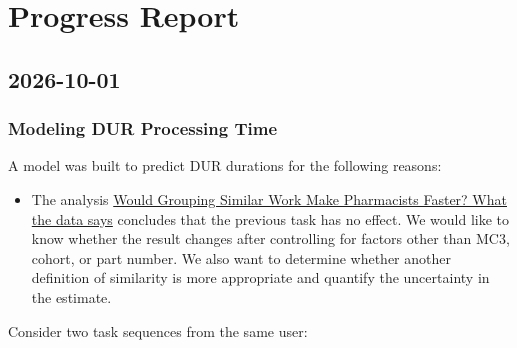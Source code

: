 \documentclass[
]{article}
\author{}
\date{}
\providecommand{\tightlist}{%
  \setlength{\itemsep}{0pt}\setlength{\parskip}{0pt}}
\begin{document}
\section{Progress Report}\label{progress-report}

\subsection{2026-10-01}\label{2026-10-01}

\subsubsection{Modeling DUR Processing
Time}\label{modeling-dur-processing-time}

A model was built to predict DUR durations for the following reasons:

\begin{itemize}
\tightlist
\item
  The analysis
  \href{https://chewyinc.atlassian.net/wiki/x/hYRyRQE}{Would Grouping
  Similar Work Make Pharmacists Faster? What the data says} concludes
  that the previous task has no effect. We would like to know whether
  the result changes after controlling for factors other than MC3,
  cohort, or part number. We also want to determine whether another
  definition of similarity is more appropriate and quantify the
  uncertainty in the estimate.
\end{itemize}

Consider two task sequences from the same user:
\end{document}
